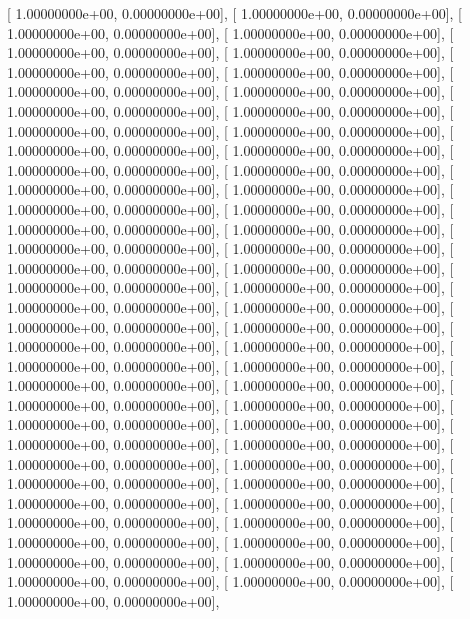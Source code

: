 \documentclass{article}
\begin{document}
       [ 1.00000000e+00,  0.00000000e+00],
       [ 1.00000000e+00,  0.00000000e+00],
       [ 1.00000000e+00,  0.00000000e+00],
       [ 1.00000000e+00,  0.00000000e+00],
       [ 1.00000000e+00,  0.00000000e+00],
       [ 1.00000000e+00,  0.00000000e+00],
       [ 1.00000000e+00,  0.00000000e+00],
       [ 1.00000000e+00,  0.00000000e+00],
       [ 1.00000000e+00,  0.00000000e+00],
       [ 1.00000000e+00,  0.00000000e+00],
       [ 1.00000000e+00,  0.00000000e+00],
       [ 1.00000000e+00,  0.00000000e+00],
       [ 1.00000000e+00,  0.00000000e+00],
       [ 1.00000000e+00,  0.00000000e+00],
       [ 1.00000000e+00,  0.00000000e+00],
       [ 1.00000000e+00,  0.00000000e+00],
       [ 1.00000000e+00,  0.00000000e+00],
       [ 1.00000000e+00,  0.00000000e+00],
       [ 1.00000000e+00,  0.00000000e+00],
       [ 1.00000000e+00,  0.00000000e+00],
       [ 1.00000000e+00,  0.00000000e+00],
       [ 1.00000000e+00,  0.00000000e+00],
       [ 1.00000000e+00,  0.00000000e+00],
       [ 1.00000000e+00,  0.00000000e+00],
       [ 1.00000000e+00,  0.00000000e+00],
       [ 1.00000000e+00,  0.00000000e+00],
       [ 1.00000000e+00,  0.00000000e+00],
       [ 1.00000000e+00,  0.00000000e+00],
       [ 1.00000000e+00,  0.00000000e+00],
       [ 1.00000000e+00,  0.00000000e+00],
       [ 1.00000000e+00,  0.00000000e+00],
       [ 1.00000000e+00,  0.00000000e+00],
       [ 1.00000000e+00,  0.00000000e+00],
       [ 1.00000000e+00,  0.00000000e+00],
       [ 1.00000000e+00,  0.00000000e+00],
       [ 1.00000000e+00,  0.00000000e+00],
       [ 1.00000000e+00,  0.00000000e+00],
       [ 1.00000000e+00,  0.00000000e+00],
       [ 1.00000000e+00,  0.00000000e+00],
       [ 1.00000000e+00,  0.00000000e+00],
       [ 1.00000000e+00,  0.00000000e+00],
       [ 1.00000000e+00,  0.00000000e+00],
       [ 1.00000000e+00,  0.00000000e+00],
       [ 1.00000000e+00,  0.00000000e+00],
       [ 1.00000000e+00,  0.00000000e+00],
       [ 1.00000000e+00,  0.00000000e+00],
       [ 1.00000000e+00,  0.00000000e+00],
       [ 1.00000000e+00,  0.00000000e+00],
       [ 1.00000000e+00,  0.00000000e+00],
       [ 1.00000000e+00,  0.00000000e+00],
       [ 1.00000000e+00,  0.00000000e+00],
       [ 1.00000000e+00,  0.00000000e+00],
       [ 1.00000000e+00,  0.00000000e+00],
       [ 1.00000000e+00,  0.00000000e+00],
       [ 1.00000000e+00,  0.00000000e+00],
       [ 1.00000000e+00,  0.00000000e+00],
       [ 1.00000000e+00,  0.00000000e+00],
       [ 1.00000000e+00,  0.00000000e+00],
       [ 1.00000000e+00,  0.00000000e+00],
       [ 1.00000000e+00,  0.00000000e+00],
       [ 1.00000000e+00,  0.00000000e+00],
\end{document}
